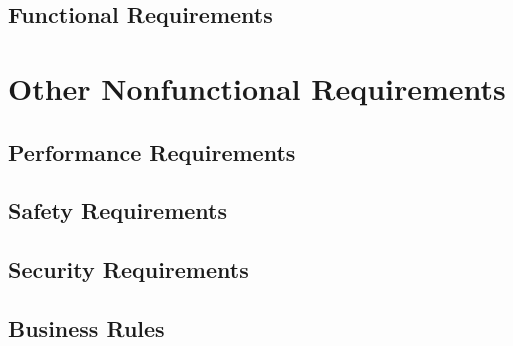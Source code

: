 \section{Functional Requirements}

\chapter{Other Nonfunctional Requirements}
\label{Other Nonfunctional Requirements}

\section{Performance Requirements}
\section{Safety Requirements}
\section{Security Requirements}
\section{Business Rules}


